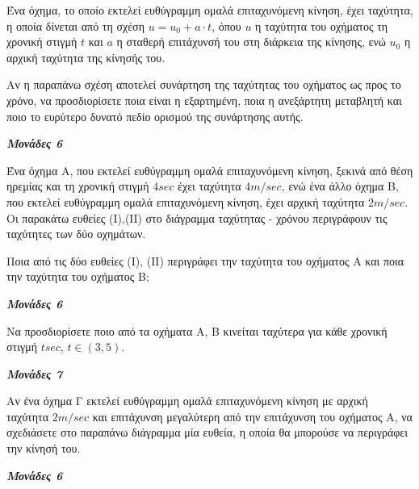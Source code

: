 \documentclass[11pt,a4paper,twoside]{book}
\newcommand{\monades}[1]{
\hspace*{\fill}
\textbf{\textit{\textcolor{maincolor}{Μονάδες #1}}}}
\begin{document}
Ένα όχημα, το οποίο εκτελεί ευθύγραμμη ομαλά επιταχυνόμενη κίνηση, έχει ταχύτητα, η οποία δίνεται από τη σχέση $u = u_{0} + a \cdot t$, όπου $u$ η ταχύτητα του οχήματος τη χρονική στιγμή $t$ και $a$ η σταθερή επιτάχυνσή του στη διάρκεια της κίνησης, ενώ $u_{0}$ η αρχική ταχύτητα της κίνησής του.
\begin{alist}
\item Αν η παραπάνω σχέση αποτελεί συνάρτηση της ταχύτητας του οχήματος ως προς το χρόνο, να προσδιορίσετε ποια είναι η εξαρτημένη, ποια η ανεξάρτητη μεταβλητή και ποιο το ευρύτερο δυνατό πεδίο ορισμού της συνάρτησης αυτής.
\monades{6}
\item Ένα όχημα Α, που εκτελεί ευθύγραμμη ομαλά επιταχυνόμενη κίνηση, ξεκινά από θέση ηρεμίας και τη χρονική στιγμή $4 \si{sec}$ έχει ταχύτητα $4 \si{m/sec}$, ενώ ένα άλλο όχημα Β, που εκτελεί ευθύγραμμη ομαλά επιταχυνόμενη κίνηση, έχει αρχική ταχύτητα $2 \si{m/sec}$. Οι παρακάτω ευθείες (Ι),(ΙΙ) στο διάγραμμα ταχύτητας - χρόνου περιγράφουν τις ταχύτητες των δύο οχημάτων.
\begin{marginfigure}

\end{marginfigure}
\begin{rlist}
\item Ποια από τις δύο ευθείες (Ι), (ΙΙ) περιγράφει την ταχύτητα του οχήματος Α και ποια την ταχύτητα του οχήματος Β;

\monades{6}
\item Να προσδιορίσετε ποιο από τα οχήματα Α, Β κινείται ταχύτερα για κάθε χρονική στιγμή $t \si{sec}$, $t \in (3,5)$.
\monades{7}
\item Αν ένα όχημα Γ εκτελεί ευθύγραμμη ομαλά επιταχυνόμενη κίνηση με αρχική ταχύτητα $2 \si{m/sec}$ και επιτάχυνση μεγαλύτερη από την επιτάχυνση του οχήματος Α, να σχεδιάσετε στο παραπάνω διάγραμμα μία ευθεία, η οποία θα μπορούσε να περιγράφει την κίνησή του.
\monades{6}
\end{rlist}
\end{alist}
\end{document}
